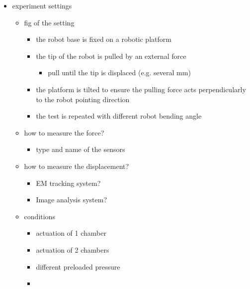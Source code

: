 \documentclass[journal,onecolumn]{IEEEtran}
\begin{document}
\begin{itemize}
\item experiment settings
\begin{itemize}
\item fig of the setting
\begin{itemize}
\item the robot base is fixed on a robotic platform
\item the tip of the robot is pulled by an external force
\begin{itemize}
\item pull until the tip is displaced (e.g. several mm)
\end{itemize}
\item the platform is tilted to ensure the pulling force acts perpendicularly to the robot pointing direction
\item the test is repeated with different robot bending angle
\end{itemize}
\item how to measure the force?
\begin{itemize}
\item type and name of the sensors
\end{itemize}
\item how to measure the displacement?
\begin{itemize}
\item EM tracking system?
\item Image analysis system?
\end{itemize}
\item conditions
\begin{itemize}
\item actuation of 1 chamber
\item actuation of 2 chambers
\item different preloaded pressure
\item 
\end{itemize}
\end{itemize}
\end{itemize}
\end{document}
